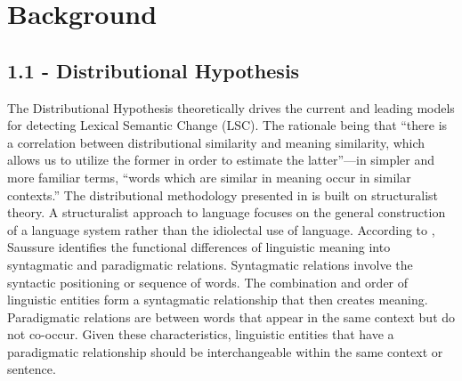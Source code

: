\section{Background}
\subsection{1.1 - Distributional Hypothesis}

The Distributional Hypothesis theoretically drives the current and leading models for detecting Lexical Semantic Change (LSC). The rationale being that “there is a correlation between distributional similarity and meaning similarity, which allows us to utilize the former in order to estimate the latter”—in simpler and more familiar terms, “words which are similar in meaning occur in similar contexts.” \citep{sahlgren2008distributional} The distributional methodology presented in \citet{harris1970distributional} is built on structuralist theory. A structuralist approach to language focuses on the general construction of a language system rather than the idiolectal use of language. According to \citet{sahlgren2008distributional}, Saussure identifies the functional differences of linguistic meaning into syntagmatic and paradigmatic relations. Syntagmatic relations involve the syntactic positioning or sequence of words. The combination and order of linguistic entities form a syntagmatic relationship that then creates meaning. Paradigmatic relations are between words that appear in the same context but do not co-occur. Given these characteristics, linguistic entities that have a paradigmatic relationship should be interchangeable within the same context or sentence. 